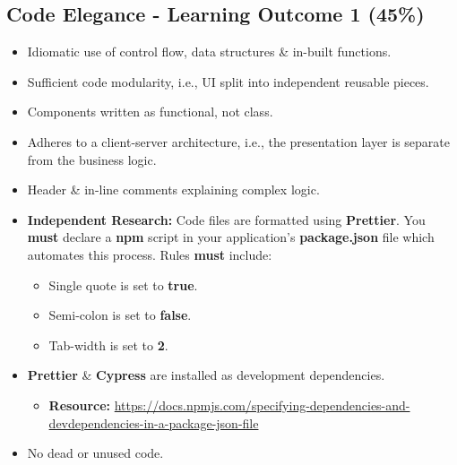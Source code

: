 \documentclass{article}
\begin{document}
\subsection*{Code Elegance - Learning Outcome 1 (45\%)}
\begin{itemize}
    \item Idiomatic use of control flow, data structures \& in-built functions.
    \item Sufficient code modularity, i.e., UI split into independent reusable pieces.
    \item Components written as functional, not class.
    \item Adheres to a client-server architecture, i.e., the presentation layer is separate from the business logic.
    \item Header \& in-line comments explaining complex logic.
    \item \textbf{Independent Research:} Code files are formatted using \textbf{Prettier}. You \textbf{must} declare a \textbf{npm} script in your application's \textbf{package.json} file which automates this process. Rules \textbf{must} include:
    \begin{itemize}
        \item Single quote is set to \textbf{true}.
        \item Semi-colon is set to \textbf{false}.
        \item Tab-width is set to \textbf{2}.
    \end{itemize}
    \item \textbf{Prettier} \& \textbf{Cypress} are installed as development dependencies.
    \begin{itemize}
        \item \textbf{Resource:} \small\href{https://docs.npmjs.com/specifying-dependencies-and-devdependencies-in-a-package-json-file}{https://docs.npmjs.com/specifying-dependencies-and-devdependencies-in-a-package-json-file}
    \end{itemize}
    \item No dead or unused code.
\end{itemize}
\end{document}
